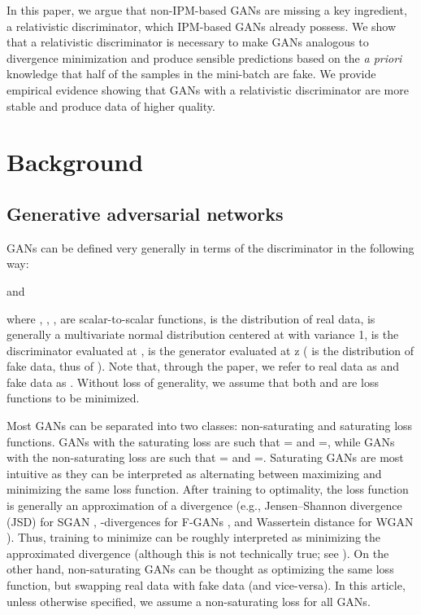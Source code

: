\documentclass{article}
\begin{document}
In this paper, we argue that non-IPM-based GANs are missing a key ingredient, a relativistic discriminator, which IPM-based GANs already possess. We show that a relativistic discriminator is necessary to make GANs analogous to divergence minimization and produce sensible predictions based on the \textit{a priori} knowledge that half of the samples in the mini-batch are fake. We provide empirical evidence showing that GANs with a relativistic discriminator are more stable and produce data of higher quality.

\section{Background}

\subsection{Generative adversarial networks}

GANs can be defined very generally in terms of the discriminator in the following way:

and

where , , ,  are scalar-to-scalar functions,  is the distribution of real data,   is generally a multivariate normal distribution centered at  with variance 1,  is the discriminator evaluated at ,  is the generator evaluated at z ( is the distribution of fake data, thus of ). Note that, through the paper, we refer to real data as  and fake data as . Without loss of generality, we assume that both  and  are loss functions to be minimized.

Most GANs can be separated into two classes: non-saturating and saturating loss functions. GANs with the saturating loss are such that = and =, while GANs with the non-saturating loss are such that = and =. Saturating GANs are most intuitive as they can be interpreted as alternating between maximizing and minimizing the same loss function. After training  to optimality, the loss function is generally an approximation of a divergence (e.g., Jensen–Shannon divergence (JSD) for SGAN \citep{GAN}, -divergences for F-GANs \citep{F-GAN}, and Wassertein distance for WGAN \citep{WGAN}). Thus, training  to minimize  can be roughly interpreted as minimizing the approximated divergence (although this is not technically true; see \citet{alexia2018beyonddivergence}). On the other hand, non-saturating GANs can be thought as optimizing the same loss function, but swapping real data with fake data (and vice-versa). In this article, unless otherwise specified, we assume a non-saturating loss for all GANs.
\end{document}
